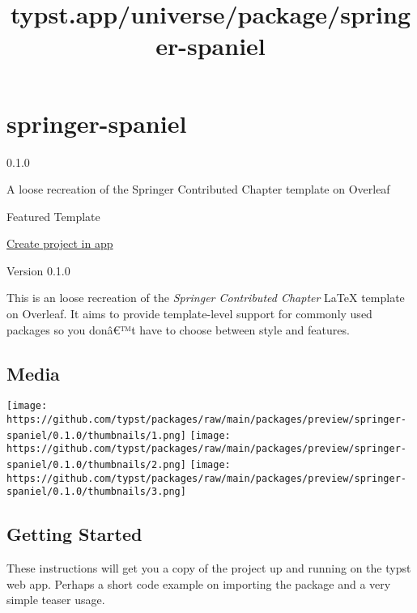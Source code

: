 \title{typst.app/universe/package/springer-spaniel}

\label{banner}
\label{template-thumbnail}

\section{springer-spaniel}\label{springer-spaniel}

{ 0.1.0 }

A loose recreation of the Springer Contributed Chapter template on
Overleaf

{ } Featured Template

\href{/app?template=springer-spaniel&version=0.1.0}{Create project in
app}

\label{readme}
Version 0.1.0

This is an loose recreation of the \emph{Springer Contributed Chapter}
LaTeX template on Overleaf. It aims to provide template-level support
for commonly used packages so you donâ€™t have to choose between style
and features.

\subsection{Media}\label{media}

\texttt{[image: https://github.com/typst/packages/raw/main/packages/preview/springer-spaniel/0.1.0/thumbnails/1.png]}
\texttt{[image: https://github.com/typst/packages/raw/main/packages/preview/springer-spaniel/0.1.0/thumbnails/2.png]}
\texttt{[image: https://github.com/typst/packages/raw/main/packages/preview/springer-spaniel/0.1.0/thumbnails/3.png]}

\subsection{Getting Started}\label{getting-started}

These instructions will get you a copy of the project up and running on
the typst web app. Perhaps a short code example on importing the package
and a very simple teaser usage.

